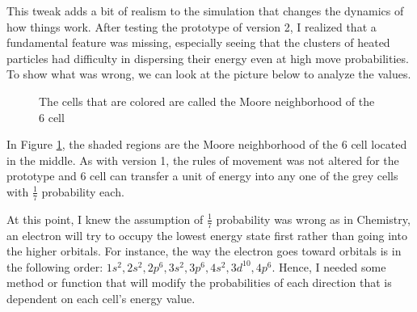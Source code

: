 \vspace{0.3cm}
\noindent
This tweak adds a bit of realism to the simulation that changes the dynamics of how things work. After testing the prototype of version 2, I realized that a fundamental feature was missing, especially seeing that the clusters of heated particles had difficulty in dispersing their energy even at high move probabilities. To show what was wrong, we can look at the picture below to analyze the values. 
\begin{figure}[H]
\centering %
\caption{\small {The cells that are colored are called the Moore neighborhood of the 6 cell}}
\label{fig:myfigure}
\end{figure}
In Figure \ref{fig:myfigure}, the shaded regions are the Moore neighborhood of the 6 cell located in the middle. As with version 1, the rules of movement was not altered for the prototype and 6 cell can transfer a unit of energy into any one of the grey cells with $\frac{1}{7}$ probability each. \par

\vspace{0.3cm}
\noindent
At this point, I knew the assumption of $\frac{1}{7}$ probability was wrong as in Chemistry, an electron will try to occupy the lowest energy state first rather than going into the higher orbitals. For instance, the way the electron goes toward orbitals is in the following order: ${1s^{2}, 2s^{2}, 2p^{6}, 3s^{2}, 3p^{6}, 4s^{2}, 3d^{10}, 4p^{6}}$. Hence, I needed some method or function that will modify the probabilities of each direction that is dependent on each cell's energy value. \par

